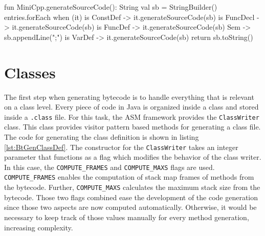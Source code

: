 \begin{KotlinCode}[float,numbers=none,caption=Implementation of the \texttt{generateSourceCode} method for the \texttt{MiniCpp} class., label=lst:SrcGenMiniCpp]
fun MiniCpp.generateSourceCode(): String {
    val sb = StringBuilder()
    entries.forEach {
        when (it) {
            is ConstDef -> it.generateSourceCode(sb)
            is FuncDecl -> it.generateSourceCode(sb)
            is FuncDef  -> it.generateSourceCode(sb)
            Sem         -> sb.appendLine(";")
            is VarDef   -> it.generateSourceCode(sb)
        }
    }
    return sb.toString()
}
\end{KotlinCode}
    


\section{Classes}

The first step when generating bytecode is to handle everything that is relevant on a class level. Every piece of code in Java is organized inside a class and stored inside a \verb|.class| file. For this task, the ASM framework provides the \verb|ClassWriter| class. This class provides visitor pattern based methods for generating a class file. The code for generating the class definition is shown in listing \ref{lst:BtGenClassDef}. The constructor for the \verb|ClassWriter| takes an integer parameter that functions as a flag which modifies the behavior of the class writer. In this case, the \verb|COMPUTE_FRAMES| and  \verb|COMPUTE_MAXS| flags are used. \verb|COMPUTE_FRAMES| enables the computation of stack map frames of methods from the bytecode. Further, \verb|COMPUTE_MAXS| calculates the maximum stack size from the bytecode. Those two flags combined ease the development of the code generation since those two aspects are now computed automatically. Otherwise, it would be necessary to keep track of those values manually for every method generation, increasing complexity. 

